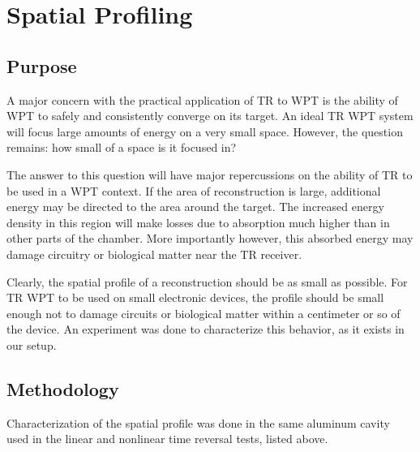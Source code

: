 \chapter{Spatial Profiling}
\label{ch:spatial-profile}
\section{Purpose}
\label{sec:spatial-profile-purpose}

A major concern with the practical application of TR to WPT is the ability of WPT to safely and consistently converge on its target.  An ideal TR WPT system will focus large amounts of energy on a very small space.  However, the question remains: how small of a space is it focused in?

The answer to this question will have major repercussions on the ability of TR to be used in a WPT context.  If the area of reconstruction is large, additional energy may be directed to the area around the target.  The increased energy density in this region will make losses due to absorption much higher than in other parts of the chamber.  More importantly however, this absorbed energy may damage circuitry or biological matter near the TR receiver.

Clearly, the spatial profile of a reconstruction should be as small as possible.  For TR WPT to be used on small electronic devices, the profile should be small enough not to damage circuits or biological matter within a centimeter or so of the device.  An experiment was done to characterize this behavior, as it exists in our setup.

\section{Methodology}
\label{sec:spatial-profile-meth}

Characterization of the spatial profile was done in the same aluminum cavity used in the linear and nonlinear time reversal tests, listed above.

